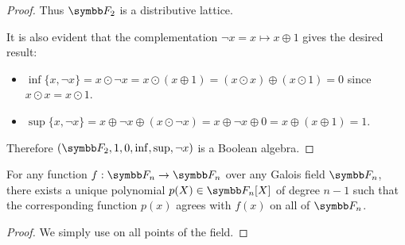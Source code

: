 \begin{proof}
  Thus \( \Fld_2 \) is a distributive lattice.

  It is also evident that the complementation \( \neg x = x \mapsto x \oplus 1 \) gives the desired result:
  \begin{itemize}
    \item \( \inf \{ x, \neg x \} = x \odot \neg x = x \odot (x \oplus 1) = (x \odot x) \oplus (x \odot 1) = 0 \) since \( x \odot x = x \odot 1 \).
    \item \( \sup \{ x, \neg x \} = x \oplus \neg x \oplus (x \odot \neg x) = x \oplus \neg x \oplus 0 = x \oplus (x \oplus 1) = 1 \).
  \end{itemize}

  Therefore \( (\Fld_2, 1, 0, \inf, \sup, \neg x ) \) is a Boolean algebra.
\end{proof}

\begin{proposition}
  For any function \( f: \Fld_n \to \Fld_n \) over any Galois field \( \Fld_n \), there exists a unique polynomial \( p(X) \in \Fld_n[X] \) of degree \( n - 1 \) such that the corresponding function \( p(x) \) agrees with \( f(x) \) on all of \( \Fld_n \).
\end{proposition}
\begin{proof}
  We simply use  on all points of the field.
\end{proof}
